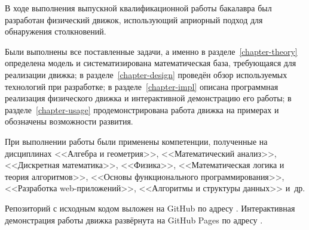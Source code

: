 
В ходе выполнения выпускной квалификационной работы бакалавра был разработан
физический движок, использующий априорный подход для обнаружения столкновений.

Были выполнены все поставленные задачи, а именно
в разделе~\ref{chapter-theory} определена модель и систематизирована математическая база, требующаяся для реализации движка;
в разделе~\ref{chapter-design} проведён обзор используемых технологий при разработке;
в разделе~\ref{chapter-impl} описана программная реализация физического движка и интерактивной демонстрацию его работы;
в разделе~\ref{chapter-usage} продемонстрирована работа движка на примерах и обозначены возможности развития.

При выполнении работы были применены компетенции, полученные на дисциплинах
<<Алгебра и геометрия>>,
<<Математический анализ>>,
<<Дискретная математика>>,
<<Физика>>,
<<Математическая логика и теория алгоритмов>>,
<<Основы функционального программирования>>,
<<Разработка web-приложений>>,
<<Алгоритмы и структуры данных>>
и~др.

Репозиторий с исходным кодом выложен на GitHub по адресу
\underline{}.
Интерактивная демонстрация работы движка развёрнута на GitHub Pages по адресу
\underline{}.
